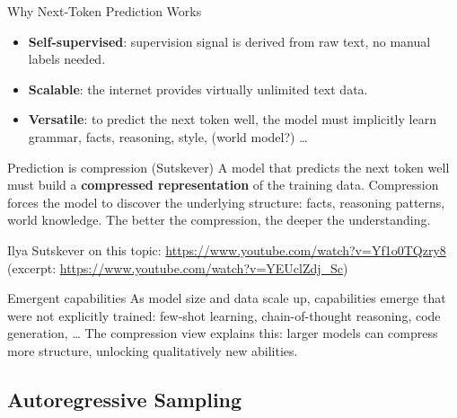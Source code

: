 \begin{frame}{Why Next-Token Prediction Works}
  \begin{itemize}
    \item \textbf{Self-supervised}: supervision signal is derived from raw text, no manual labels needed.
    \item \textbf{Scalable}: the internet provides virtually unlimited text data.
    \item \textbf{Versatile}: to predict the next token well, the model must implicitly learn grammar, facts, reasoning, style, (world model?) \ldots
  \end{itemize}

  \vspace{0.5em}
  \begin{block}{Prediction is compression (Sutskever)}
    A model that predicts the next token well must build a \textbf{compressed representation} of the training data.
    Compression forces the model to discover the underlying structure: facts, reasoning patterns, world knowledge.
    The better the compression, the deeper the understanding.

    \vspace{0.3em}
    {\small Ilya Sutskever on this topic: \url{https://www.youtube.com/watch?v=Yf1o0TQzry8} (excerpt: \url{https://www.youtube.com/watch?v=YEUclZdj_Sc})}
  \end{block}

  \vspace{0.5em}
  \begin{alertblock}{Emergent capabilities}
    As model size and data scale up, capabilities emerge that were not explicitly trained: few-shot learning, chain-of-thought reasoning, code generation, \ldots
    The compression view explains this: larger models can compress more structure, unlocking qualitatively new abilities.
  \end{alertblock}
\end{frame}

\subsection{Autoregressive Sampling}

